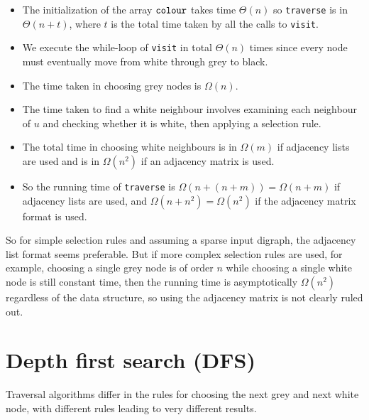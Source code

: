 
\begin{itemize}
  \item The initialization of the array $\operatorname{\text{\texttt{colour}}}$ takes time $\Theta(n)$ so \texttt{traverse} 
  is in $\Theta(n + t)$, where $t$ is the total time taken by all the calls to \texttt{visit}.
  \item We execute the while-loop of \texttt{visit} in total $\Theta(n)$ times 
  since every node must eventually move from white through grey to black. 
  \item The time taken in choosing grey nodes is $\Omega(n)$. 
  \item The time taken to find a white neighbour involves examining each neighbour of $u$ 
  and checking whether it is white, then applying a selection rule. 
  \item The total time in choosing white neighbours is in $\Omega(m)$ if adjacency lists are used 
  and is in $\Omega(n^2)$ if an adjacency matrix is used.
  \item So the running time of \texttt{traverse} is $\Omega(n + (n+m)) = \Omega(n + m)$
  if adjacency lists are used, and $\Omega(n + n^2) = \Omega(n^2)$ if the adjacency matrix format is used.
\end{itemize}

So for simple selection rules and assuming a sparse input digraph, the adjacency list format seems
preferable. But if more complex selection rules are used, for example, choosing a single grey node is 
of order $n$ while choosing a single white node is still constant time, then the running time is 
asymptotically $\Omega(n^2)$ regardless of the data structure, so using
the adjacency matrix is not clearly ruled out.


\chapter{Depth first search (DFS)} %
Traversal algorithms differ in the rules for choosing the next grey and next white node, 
with different rules leading to very different results.

